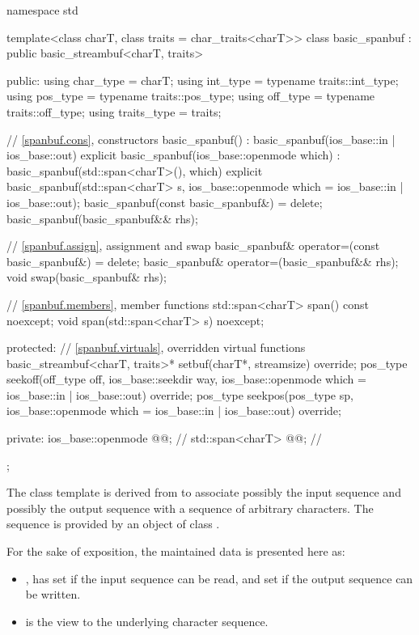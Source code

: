 %
\begin{codeblock}
namespace std {
  template<class charT, class traits = char_traits<charT>>
  class basic_spanbuf
    : public basic_streambuf<charT, traits> {
  public:
    using char_type   = charT;
    using int_type    = typename traits::int_type;
    using pos_type    = typename traits::pos_type;
    using off_type    = typename traits::off_type;
    using traits_type = traits;

    // \ref{spanbuf.cons}, constructors
    basic_spanbuf() : basic_spanbuf(ios_base::in | ios_base::out) {}
    explicit basic_spanbuf(ios_base::openmode which)
      : basic_spanbuf(std::span<charT>(), which) {}
    explicit basic_spanbuf(std::span<charT> s,
                           ios_base::openmode which = ios_base::in | ios_base::out);
    basic_spanbuf(const basic_spanbuf&) = delete;
    basic_spanbuf(basic_spanbuf&& rhs);

    // \ref{spanbuf.assign}, assignment and swap
    basic_spanbuf& operator=(const basic_spanbuf&) = delete;
    basic_spanbuf& operator=(basic_spanbuf&& rhs);
    void swap(basic_spanbuf& rhs);

    // \ref{spanbuf.members}, member functions
    std::span<charT> span() const noexcept;
    void span(std::span<charT> s) noexcept;

  protected:
    // \ref{spanbuf.virtuals}, overridden virtual functions
    basic_streambuf<charT, traits>* setbuf(charT*, streamsize) override;
    pos_type seekoff(off_type off, ios_base::seekdir way,
                     ios_base::openmode which = ios_base::in | ios_base::out) override;
    pos_type seekpos(pos_type sp,
                     ios_base::openmode which = ios_base::in | ios_base::out) override;

  private:
    ios_base::openmode @@;            // \expos
    std::span<charT> @@;               // \expos
};
}
\end{codeblock}

\pnum
The class template  is derived from 
to associate possibly the input sequence and possibly the output sequence
with a sequence of arbitrary characters.
The sequence is provided by an object of class .

\pnum
For the sake of exposition, the maintained data is presented here as:
\begin{itemize}
\item
{}, has
 set if the input sequence can be read, and
 set if the output sequence can be written.
\item
{} is the view to
the underlying character sequence.
\end{itemize}

